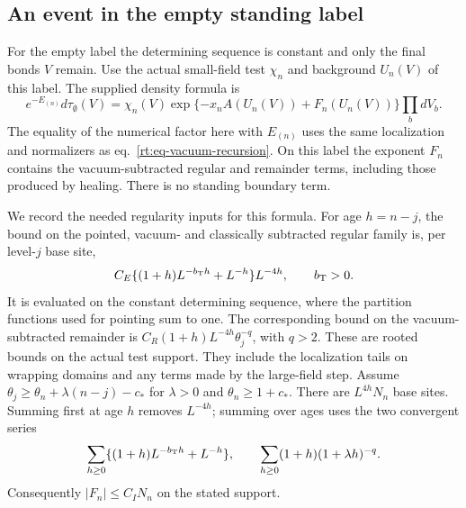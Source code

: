 \documentclass[11pt,letterpaper,reqno]{amsart}
\numberwithin{equation}{section}
\renewcommand{\eqref}[1]{\textup{eq.~\ref{#1}}}
\theoremstyle{definition}
\theoremstyle{remark}
\begin{document}
\subsection{An event in the empty standing label}

For the empty label the determining sequence is constant and
only the final bonds \(V\) remain. Use the actual small-field
test \(\chi_n\) and background \(U_n(V)\) of this label. The
supplied density formula is
\begin{equation}\label{rt:eq-empty-label-density}
 e^{-E_{(n)}}d\tau_{\emptyset}(V)
   =\chi_n(V)\exp\{-x_n A(U_n(V))+F_n(U_n(V))\}
                      \prod_{b}dV_b .
\end{equation}
The equality of the numerical factor here with \(E_{(n)}\)
uses the same localization and normalizers as
\eqref{rt:eq-vacuum-recursion}. On this label the exponent
\(F_n\) contains the vacuum-subtracted regular and remainder
terms, including those produced by healing. There is no
standing boundary term.

We record the needed regularity inputs for this formula.
For age \(h=n-j\), the bound on the pointed, vacuum- and
classically subtracted regular family is, per level-\(j\)
base site,
\[
  C_E\{(1+h)L^{-b_{\rm T}h}+L^{-h}\}L^{-4h},
  \qquad b_{\rm T}>0 .
\]
It is evaluated on the constant determining sequence, where
the partition functions used for pointing sum to one. The
corresponding bound on the vacuum-subtracted remainder is
\(C_R(1+h)L^{-4h}\theta_j^{-q}\), with \(q>2\).
These are rooted bounds on the actual test support. They include
the localization tails on wrapping domains and any terms made
by the large-field step. Assume
\(\theta_j\ge\theta_n+\lambda(n-j)-c_*\) for \(\lambda>0\)
and \(\theta_n\ge1+c_*\). There are \(L^{4h}N_n\) base sites.
Summing first at age \(h\) removes \(L^{-4h}\); summing over
ages uses the two convergent series
\[
   \sum_{h\ge0}\{(1+h)L^{-b_{\rm T}h}+L^{-h}\},
   \qquad \sum_{h\ge0}(1+h)(1+\lambda h)^{-q}.
\]
Consequently \(|F_n|\le C_I N_n\) on the stated support.
\end{document}
